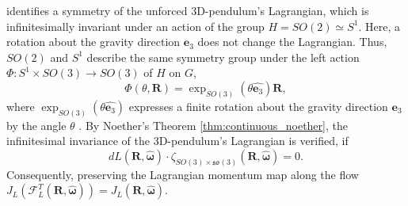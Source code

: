\cite{Lee2008} identifies a symmetry of the unforced 3D-pendulum's Lagrangian, which is infinitesimally invariant under an action of the group $H = SO(2) \simeq S^1$. Here, a rotation about the gravity direction $\bm{e}_3$ does not change the Lagrangian. Thus, $SO(2)$ and $S^1$ describe the same symmetry group under the left action $\Phi: S^1 \times SO(3) \to SO(3)$ of $H$ on $G$,
\begin{equation}\label{eq:continuous_3D_pendulum_symmetry_action}
    \Phi(\theta, \bm{R})= \exp_{SO(3)}(\theta \hat{\bm{e}_3})\bm{R},
\end{equation}
where $\exp_{SO(3)}(\theta \hat{\bm{e}_3})$ expresses a finite rotation about the gravity direction $\bm{e}_3$ by the angle $\theta$ \cite{Lee2008}. By Noether's Theorem \ref{thm:continuous_noether}, the infinitesimal invariance of the 3D-pendulum's Lagrangian is verified, if 
\begin{equation}\label{eq:continuous_3D_momentum_conservation}
    dL(\bm{R},\hat{\bm{\omega}})\cdot \zeta_{SO(3)\times\mathfrak{so}(3)}(\bm{R}, \hat{\bm{\omega}}) = 0.
\end{equation}
Consequently, preserving the Lagrangian momentum map along the flow $J_L\!\left(\mathcal{F}_L^T(\bm{R},\hat{\bm{\omega}})\right)=J_L(\bm{R},\hat{\bm{\omega}})$.

